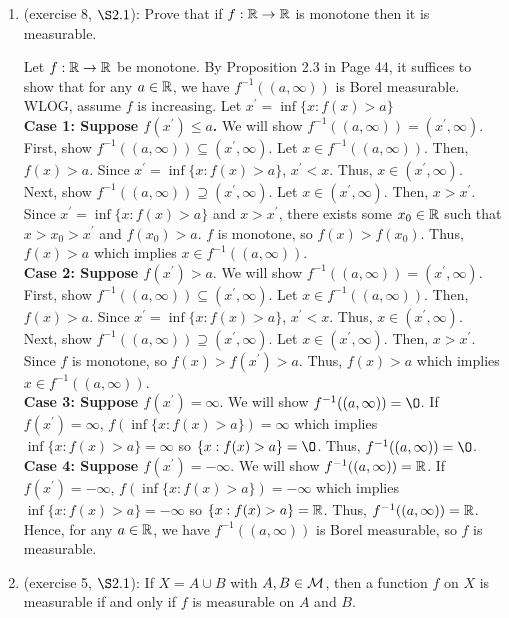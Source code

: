 \begin{enumerate}
\item (exercise 8, $\S 2.1$): Prove that if $f : {\mathbb R} \rightarrow {\mathbb R}$ is monotone then it is measurable.
\begin{pf}
	Let $f: {\mathbb R} \rightarrow {\mathbb R}$ be monotone.  By Proposition
2.3 in Page 44, it suffices to show that for any $a \in {\mathbb R}$, we have $f^{−1}((a, \infty))$ is Borel measurable. WLOG, assume $f$ is increasing. Let $x^{'}=\inf \{x : f(x) >a  \}$\\
	\textbf{Case 1:	Suppose $f(x^{'}) \leq a$.}
 We will show $f^{-1}((a, \infty))=(x^{'}, \infty)$. First, show $f^{-1}((a, \infty))\subseteq (x^{'}, \infty)$. Let $x \in f^{-1}((a, \infty))$. Then, $f(x)>a$. Since $x^{'}=\inf \{x : f(x) >a  \}$, $x^{'}<x$. Thus, $x \in (x^{'}, \infty)$. \\
	Next, show $f^{-1}((a, \infty))\supseteq (x^{'}, \infty)$. Let $x \in (x^{'}, \infty)$. Then, $x>x^{'}$.  Since $x^{'}=\inf \{x : f(x) >a  \}$ and $x>x^{'}$, there exists some $x_0 \in {\mathbb R}$ such that $x>x_0>x^{'}$ and $f(x_0)>a$. $f$ is monotone, so $f(x)>f(x_0)$. Thus, $f(x)>a$ which implies $x \in f^{-1}((a, \infty))$.  \\
\textbf{Case 2: Suppose $f(x^{'}) > a$}. We will show $f^{-1}((a, \infty))=(x^{'}, \infty)$. First, show $f^{-1}((a, \infty))\subseteq (x^{'}, \infty)$. Let $x \in f^{-1}((a, \infty))$. Then, $f(x)>a$. Since $x^{'}=\inf \{x : f(x) >a  \}$, $x^{'}<x$. Thus, $x \in (x^{'}, \infty)$. \\
	Next, show $f^{-1}((a, \infty))\supseteq (x^{'}, \infty)$. Let $x \in (x^{'}, \infty)$. Then, $x>x^{'}$.  Since $f$ is monotone, so $f(x)>f(x^{'})> a$. Thus, $f(x)>a$ which implies $x \in f^{-1}((a, \infty))$.  \\
	\textbf{Case 3: Suppose $f(x^{'}) =\infty$}. We will show $f^{-1}((a, \infty))=\O$. If $f(x^{'}) =\infty$, $f(\inf\{x : f(x)>a\}) =\infty$ which implies $\inf\{x : f(x)>a\} =\infty$ so $\{x : f(x)>a\}=\O$. Thus, $f^{-1}((a, \infty))=\O$.\\
	\textbf{Case 4: Suppose $f(x^{'})=-\infty$}. We will show $f^{-1}((a, \infty))={\mathbb R}$. If $f(x^{'}) =-\infty$, $f(\inf\{x : f(x)>a\}) =-\infty$ which implies $\inf\{x : f(x)>a\} =-\infty$ so $\{x : f(x)>a\}={\mathbb R}$. Thus, $f^{-1}((a, \infty))={\mathbb R}$.\\
	Hence, for any $a \in {\mathbb R}$, we have $f^{−1}((a, \infty))$ is Borel measurable, so $f$ is measurable. 
\end{pf}
\item (exercise 5, $\S 2.1$):	If $X=A \cup B$ with $A, B \in {\mathcal M}$, then a function $f$ on $X$ is measurable if and only if $f$ is measurable on $A$ and $B$. 

\end{enumerate}
